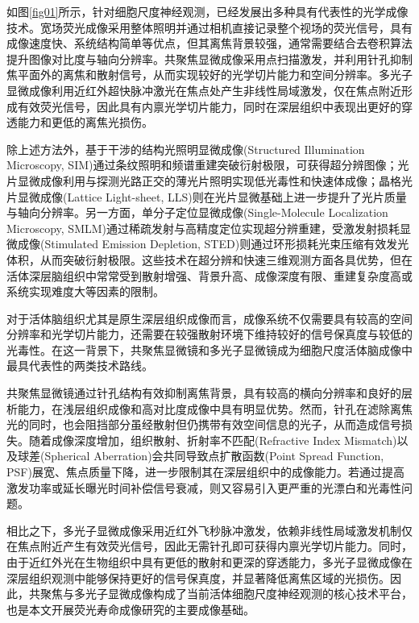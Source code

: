 如图\ref{fig01}所示，针对细胞尺度神经观测，已经发展出多种具有代表性的光学成像技术。宽场荧光成像采用整体照明并通过相机直接记录整个视场的荧光信号，具有成像速度快、系统结构简单等优点，但其离焦背景较强，通常需要结合去卷积算法提升图像对比度与轴向分辨率。共聚焦显微成像采用点扫描激发，并利用针孔抑制焦平面外的离焦和散射信号，从而实现较好的光学切片能力和空间分辨率。多光子显微成像利用近红外超快脉冲激光在焦点处产生非线性局域激发，仅在焦点附近形成有效荧光信号，因此具有内禀光学切片能力，同时在深层组织中表现出更好的穿透能力和更低的离焦光损伤。

除上述方法外，基于干涉的结构光照明显微成像(Structured Illumination Microscopy, SIM)通过条纹照明和频谱重建突破衍射极限，可获得超分辨图像；光片显微成像利用与探测光路正交的薄光片照明实现低光毒性和快速体成像；晶格光片显微成像(Lattice Light-sheet, LLS)则在光片显微基础上进一步提升了光片质量与轴向分辨率。另一方面，单分子定位显微成像(Single-Molecule Localization Microscopy, SMLM)通过稀疏发射与高精度定位实现超分辨重建，受激发射损耗显微成像(Stimulated Emission Depletion, STED)则通过环形损耗光束压缩有效发光体积，从而突破衍射极限。这些技术在超分辨和快速三维观测方面各具优势，但在活体深层脑组织中常常受到散射增强、背景升高、成像深度有限、重建复杂度高或系统实现难度大等因素的限制。

对于活体脑组织尤其是原生深层组织成像而言，成像系统不仅需要具有较高的空间分辨率和光学切片能力，还需要在较强散射环境下维持较好的信号保真度与较低的光毒性。在这一背景下，共聚焦显微镜和多光子显微镜成为细胞尺度活体脑成像中最具代表性的两类技术路线。

共聚焦显微镜通过针孔结构有效抑制离焦背景，具有较高的横向分辨率和良好的层析能力，在浅层组织成像和高对比度成像中具有明显优势。然而，针孔在滤除离焦光的同时，也会阻挡部分虽经散射但仍携带有效空间信息的光子，从而造成信号损失。随着成像深度增加，组织散射、折射率不匹配(Refractive Index Mismatch)以及球差(Spherical Aberration)会共同导致点扩散函数(Point Spread Function, PSF)展宽、焦点质量下降，进一步限制其在深层组织中的成像能力\cite{RN2022}。若通过提高激发功率或延长曝光时间补偿信号衰减，则又容易引入更严重的光漂白和光毒性问题。

相比之下，多光子显微成像采用近红外飞秒脉冲激发，依赖非线性局域激发机制仅在焦点附近产生有效荧光信号，因此无需针孔即可获得内禀光学切片能力。同时，由于近红外光在生物组织中具有更低的散射和更深的穿透能力，多光子显微成像在深层组织观测中能够保持更好的信号保真度，并显著降低离焦区域的光损伤\cite{RN2024,RN2028}。因此，共聚焦与多光子显微成像构成了当前活体细胞尺度神经观测的核心技术平台，也是本文开展荧光寿命成像研究的主要成像基础。

